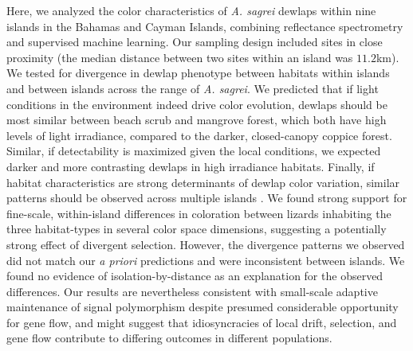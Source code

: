 Here, we analyzed the color characteristics of \textit{A. sagrei} dewlaps within nine islands in the Bahamas and Cayman Islands, combining reflectance spectrometry and supervised machine learning. Our sampling design included sites in close proximity (the median distance between two sites within an island was $11.2$km). We tested for divergence in dewlap phenotype between habitats within islands and between islands across the range of \textit{A. sagrei}. We predicted that if light conditions in the environment indeed drive color evolution, dewlaps should be most similar between beach scrub and mangrove forest, which both have high levels of light irradiance, compared to the darker, closed-canopy coppice forest. Similar, if detectability is maximized given the local conditions, we expected darker and more contrasting dewlaps in high irradiance habitats. Finally, if habitat characteristics are strong determinants of dewlap color variation, similar patterns should be observed across multiple islands \citep{Losos2011}. We found strong support for fine-scale, within-island differences in coloration between lizards inhabiting the three habitat-types in several color space dimensions, suggesting a potentially strong effect of divergent selection. However, the divergence patterns we observed did not match our \textit{a priori} predictions and were inconsistent between islands. We found no evidence of isolation-by-distance as an explanation for the observed differences. Our results are nevertheless consistent with small-scale adaptive maintenance of signal polymorphism despite presumed considerable opportunity for gene flow, and might suggest that idiosyncracies of local drift, selection, and gene flow contribute to differing outcomes in different populations.




